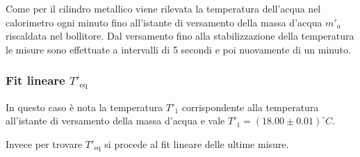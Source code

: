 \documentclass{article}
\begin{document}
	Come per il cilindro metallico viene rilevata la temperatura dell'acqua nel calorimetro ogni minuto fino all'istante di versamento della massa d'acqua \(m'_{a}\) riscaldata nel bollitore. Dal versamento fino alla stabilizzazione della temperatura le misure sono effettuate a intervalli di 5 secondi e poi nuovamente di un minuto.
	
	\subsubsection{Fit lineare \(T'_{\text{eq}}\)}
	In questo caso è nota la temperatura \(T'_{1}\) corrispondente alla temperatura all'istante di versamento della massa d'acqua e vale \(T'_{1} = (18.00 \pm 0.01)^\circ C\).
	
	Invece per trovare \(T'_{\text{eq}}\) si procede al fit lineare  delle ultime misure.
	
\end{document}
